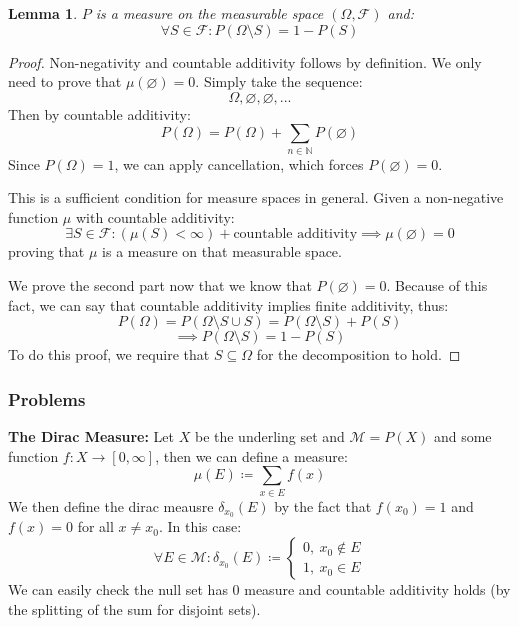\documentclass[10pt,letterpaper]{article} %
\newtheorem{lem}{Lemma}[section]
\begin{document}
\begin{lem}
$P$ is a measure on the measurable space $(\Omega, \mathcal{F})$ and:
\begin{equation*}
\forall S \in \mathcal{F}: P(\Omega \setminus S) = 1 - P(S)
\end{equation*}
\end{lem}
\begin{proof}
Non-negativity and countable additivity follows by definition. We only need to prove that $\mu(\varnothing) = 0$. Simply take the sequence:
\begin{equation*}
\Omega, \varnothing, \varnothing,...
\end{equation*}
Then by countable additivity:
\begin{equation*}
P(\Omega) = P(\Omega) + \sum_{n \in \mathbb{N}}P(\varnothing)
\end{equation*}
Since $P(\Omega) = 1$, we can apply cancellation, which forces $P(\varnothing) = 0$. 

This is a sufficient condition for measure spaces in general. Given a non-negative function $\mu$ with countable additivity:
\begin{equation*}
\exists S \in \mathcal{F}: (\mu(S) < \infty) + \text{countable additivity} \implies \mu(\varnothing) = 0
\end{equation*}
proving that $\mu$ is a measure on that measurable space.

We prove the second part now that we know that $P(\varnothing) = 0$. Because of this fact, we can say that countable additivity implies finite additivity, thus:
\begin{equation*}
P(\Omega) = P(\Omega \setminus S \cup S) = P(\Omega \setminus S) + P(S)
\end{equation*}
\begin{equation*}
\implies P(\Omega \setminus S) = 1 - P(S)
\end{equation*}
To do this proof, we require that $S \subseteq \Omega$ for the decomposition to hold.
\end{proof}

\subsubsection{Problems}
\textbf{The Dirac Measure:} Let $X$ be the underling set and $\mathcal{M} = P(X)$ and some function $f: X \xrightarrow{} [0, \infty]$, then we can define a measure:
\begin{equation*}
\mu(E) \coloneq \sum_{x \in E}f(x)
\end{equation*}
We then define the dirac meausre $\delta_{x_0}(E)$ by the fact that $f(x_0) = 1$ and $f(x) = 0$ for all $x \neq x_0$. In this case:
\begin{equation*}
\forall E \in \mathcal{M}: \delta_{x_0}(E) \coloneq \begin{cases*}
0, \ x_0 \notin E\\
1, \ x_0 \in E
\end{cases*}
\end{equation*}
We can easily check the null set has $0$ measure and countable additivity holds (by the splitting of the sum for disjoint sets).
\end{document}
